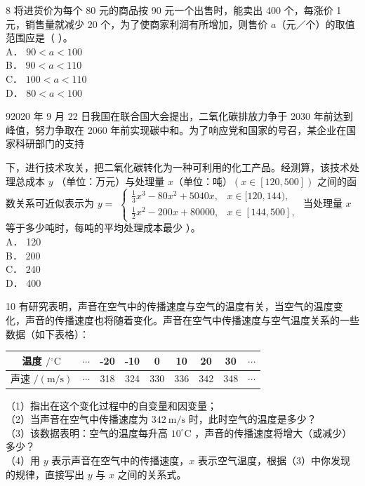 \documentclass[10pt]{article}
\begin{document}
8 将进货价为每个 80 元的商品按 90 元一个出售时，能卖出 400 个，每涨价 1 元，销售量就减少 20 个，为了使商家利润有所增加，则售价 \(a\)（元／个）的取值范围应是（ ）。\\
A． \(90<a<100\)\\
B． \(90<a<110\)\\
C． \(100<a<110\)\\
D． \(80<a<100\)

92020 年 9 月 22 日我国在联合国大会提出，二氧化碳排放力争于 2030 年前达到峰值，努力争取在 2060 年前实现碳中和。为了响应党和国家的号召，某企业在国家科研部门的支持

下，进行技术攻关，把二氧化碳转化为一种可利用的化工产品。经测算，该技术处理总成本 \(y\) （单位：万元）与处理量 \(x\)（单位：吨）\((x \in[120,500])\) 之间的函数关系可近似表示为 \(y=\) \(\left\{\begin{array}{ll}\frac{1}{3} x^{3}-80 x^{2}+5040 x, & x \in[120,144), \\ \frac{1}{2} x^{2}-200 x+80000, & x \in[144,500],\end{array}\right.\) 当处理量 \(x\) 等于多少吨时，每吨的平均处理成本最少 ）。\\
A． 120\\
B． 200\\
C． 240\\
D． 400

10 有研究表明，声音在空气中的传播速度与空气的温度有关，当空气的温度变化，声音的传播速度也将随着变化。声音在空气中传播速度与空气温度关系的一些数据（如下表格）：

\begin{center}
\begin{tabular}{|c|c|c|c|c|c|c|c|c|}
\hline
温度 \(/{ }^{\circ} \mathrm{C}\) & \(\cdots\) & -20 & -10 & 0 & 10 & 20 & 30 & \(\cdots\) \\
\hline
声速 \(/(\mathrm{m} / \mathrm{s})\) & \(\cdots\) & 318 & 324 & 330 & 336 & 342 & 348 & \(\cdots\) \\
\hline
\end{tabular}
\end{center}

（1）指出在这个变化过程中的自变量和因变量；\\
（2）当声音在空气中传播速度为 \(342 \mathrm{~m} / \mathrm{s}\) 时，此时空气的温度是多少？\\
（3）该数据表明：空气的温度每升高 \(10^{\circ} \mathrm{C}\) ，声音的传播速度将增大（或减少）多少？\\
（4）用 \(y\) 表示声音在空气中的传播速度，\(x\) 表示空气温度，根据（3）中你发现的规律，直接写出 \(y\) 与 \(x\) 之间的关系式。
\end{document}
